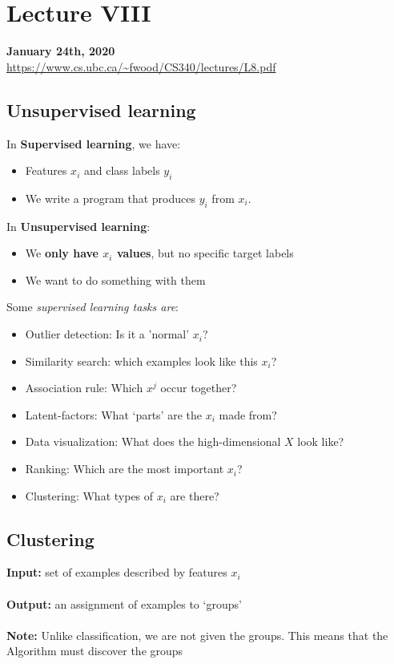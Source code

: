 \documentclass{article}
\def\blu#1{{\color{blu}#1}}
\def\red#1{{\color{red}#1}}
\theoremstyle{definition}
\begin{document}
\newpage

\section*{Lecture VIII}
\textbf{January 24th, 2020}\\
\url{https://www.cs.ubc.ca/~fwood/CS340/lectures/L8.pdf}
\subsection*{Unsupervised learning}
In \textbf{Supervised learning}, we have:
\begin{itemize}
	\item Features $ x_i $ and class labels $ y_i $
	\item We write a program that produces $ y_i $ from $ x_i $.
\end{itemize}
In \textbf{Unsupervised learning}:
\begin{itemize}
	\item We \red{\textbf{only have $ x_i $ values}}, but no specific target labels
	\item We want to do something with them 
\end{itemize}
Some \textit{supervised learning tasks are}:
\begin{itemize}
	\item Outlier detection: Is it a 'normal' $ x_i $?
	\item Similarity search: which examples look like this $ x_i $?
	\item Association rule: Which $ x^j $ occur together?
	\item Latent-factors: What ‘parts’ are the $ x_i $ made from?
	\item Data visualization: What does the high-dimensional $ X $ look like?
	\item Ranking: Which are the most important $ x_i $?
	\item \blu{Clustering: What types of $ x_i $ are there?}
\end{itemize}



\subsection*{Clustering}
\textbf{Input:} set of examples described by features $ x_i $ \\ \\
\textbf{Output:} an \blu{assignment of examples to ‘groups’} \\ \\
\textbf{Note:} Unlike classification, \red{we are not given the groups}. This means that the Algorithm must \blu{discover the groups}
\end{document}

